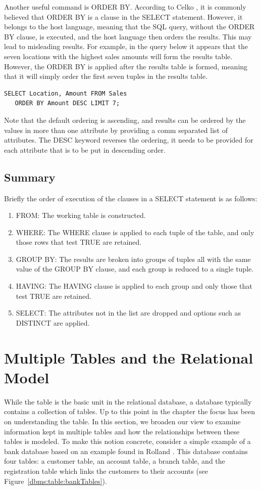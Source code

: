 Another useful command is ORDER BY. According to Celko \cite{Celko},
it is commonly believed that ORDER BY is a clause in the 
SELECT statement. 
However, it belongs to the host language, meaning that the 
SQL query, without the ORDER BY clause, is executed, and the
host language then orders the results.
This may lead to misleading results. 
For example, in the query below it appears that the seven
locations with the highest sales amounts will form the results table.  
However, the ORDER BY is applied after the results table is
formed, meaning that it will simply order the first seven tuples
in the results table.
\begin{verbatim}
SELECT Location, Amount FROM Sales 
   ORDER BY Amount DESC LIMIT 7; 
\end{verbatim}
Note that the default ordering is ascending, and 
results can be ordered by the values in more than one
attribute by providing a comm separated list of attributes.
The DESC keyword reverses the ordering, it needs to be provided 
for each attribute that is to be put in descending order. 

\subsection{Summary}
Briefly the order of execution of the clauses in a SELECT statement 
is as follows:

\begin{enumerate}
\item FROM: The working table is constructed.
\item WHERE: The WHERE clause is applied to each tuple of
the table, and only those rows that test TRUE are retained. 
\item GROUP BY: The results are broken into groups of tuples all with 
the same value of the GROUP BY clause, and each group is reduced to a 
single tuple.
\item HAVING: The HAVING clause is applied to each group and only 
those that test TRUE are retained.
\item SELECT: The attributes not in the list are dropped and options
such as DISTINCT are applied.
\end{enumerate}

\section{Multiple Tables and the Relational Model}\label{dbms:sect:multiTables}

While the table is the basic unit in the relational database, 
a database typically contains a collection of tables.
Up to this point in the chapter the focus has been on understanding the table.
In this section, we broaden our view to examine information 
kept in multiple tables and how the relationships between these tables
is modeled.
To make this notion concrete, consider a simple example of a bank 
database based on an example found in Rolland \cite{Rolland}.
This database contains four tables: 
a customer table, an account table, a branch table, and the 
registration table which links the customers to their accounts 
(see Figure~\ref{dbms:table:bankTables}).

